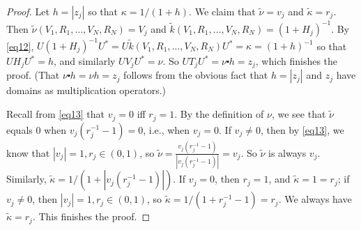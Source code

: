 \documentclass[12pt,a4paper,notitlepage]{article}
\theoremstyle{definition}
\theoremstyle{plain}
\newcommand{\mc}{\mathcal}
\newcommand{\wtd}{\widetilde}
\newcommand{\Cbb}{\mathbb C}
\numberwithin{equation}{section}
\begin{document}
\begin{proof}

Let $h=|z_j|$ so that $\kappa=1/(1+h)$. We claim that  $\wtd \nu=v_j$ and $\wtd \kappa=r_j$. Then $\wtd \nu(V_1,R_1,\dots,V_N,R_N)=V_j$ and $\wtd k(V_1,R_1,\dots,V_N,R_N)=(1+H_j)^{-1}$. By \eqref{eq12}, $U(1+H_j)^{-1}U^*=U\wtd k(V_1,R_1,\dots,V_N,R_N)U^*=\kappa=(1+h)^{-1}$ so that $UH_jU^*=h$, and similarly $UV_jU^*=\nu$. So $UT_jU^*=\nu \centerdot h=z_j$, which finishes the proof. (That $\nu\centerdot h=\nu h=z_j$ follows from the obvious fact that $h=|z_j|$ and $z_j$ have domains as multiplication operators.)  

Recall from \eqref{eq13} that $v_j=0$ iff $r_j=1$. By the definition of $\nu$, we see that $\wtd\nu$ equals $0$ when $v_j(r_j^{-1}-1)=0$, i.e., when $v_j=0$. If $v_j\neq 0$, then by \eqref{eq13}, we know that $|v_j|=1,r_j\in(0,1)$, so $\wtd\nu=\frac{v_j(r_j^{-1}-1)}{|v_j(r_j^{-1}-1)|}=v_j$. So $\wtd \nu$ is always $v_j$. Similarly, $\wtd\kappa=1/(1+|v_j(r_j^{-1}-1)|)$. If $v_j=0$, then $r_j=1$, and $\wtd\kappa=1=r_j$; if $v_j\neq 0$, then $|v_j|=1,r_j\in(0,1)$, so $\wtd\kappa=1/(1+r_j^{-1}-1)=r_j$. We always have $\wtd\kappa=r_j$. This finishes the proof.
\end{proof}
\end{document}
